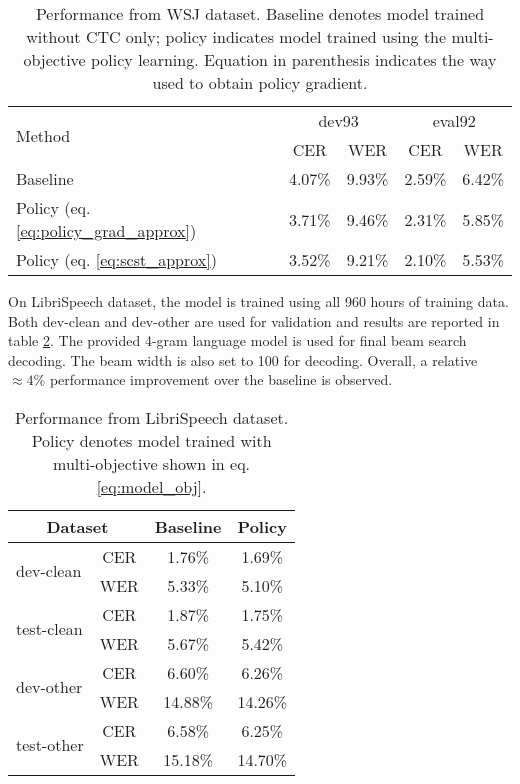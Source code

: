 \documentclass{article}
\begin{document}
\begin{table}[tbp!]
\centering
\begin{tabular}{lcccc}
\toprule
\multirow{2}{*}{Method} & \multicolumn{2}{c}{dev93} & \multicolumn{2}{c}{eval92} \\
						& CER & WER & CER & WER \\
\midrule
Baseline 								 & 4.07\% & 9.93\% & 2.59\% & 6.42\%\\
Policy (eq. \ref{eq:policy_grad_approx}) & 3.71\% & 9.46\% & 2.31\% & 5.85\%\\
Policy (eq. \ref{eq:scst_approx})  		 & 3.52\% & 9.21\% & 2.10\% & 5.53\%\\
\bottomrule
\end{tabular}
\caption{Performance from WSJ dataset. Baseline denotes model trained without CTC only; policy indicates model trained using the multi-objective policy learning. Equation in parenthesis indicates the way used to obtain policy gradient.}
\label{tbl:wsj_comp}
\end{table}


On LibriSpeech dataset, the model is trained using all 960 hours of training data. Both dev-clean and dev-other are used for validation and results are reported in table \ref{tbl:libri_comp}. The provided 4-gram language model is used for final beam search decoding. The beam width is also set to 100 for decoding. Overall, a relative $\approx 4\%$ performance improvement over the baseline is observed.


\begin{table}[tbp!]
\centering
\begin{tabular}{lccc}
\toprule
\multicolumn{2}{c}{Dataset} & Baseline & Policy \\
\midrule
\multirow{2}{*}{dev-clean} 	& CER & 1.76\% 	& 1.69\%\\
							& WER & 5.33\%	& 5.10\%\\
\midrule
\multirow{2}{*}{test-clean} & CER & 1.87\% 	& 1.75\%\\
							& WER & 5.67\%	& 5.42\%\\
\midrule
\multirow{2}{*}{dev-other} 	& CER & 6.60\% 	& 6.26\%\\
							& WER & 14.88\% & 14.26\%\\
\midrule
\multirow{2}{*}{test-other} & CER & 6.58\% 	& 6.25\%\\
							& WER & 15.18\%	& 14.70\%\\
\bottomrule
\end{tabular}
\caption{Performance from LibriSpeech dataset. Policy denotes model trained with multi-objective shown in eq. \ref{eq:model_obj}.}
\label{tbl:libri_comp}
\end{table}
\end{document}
